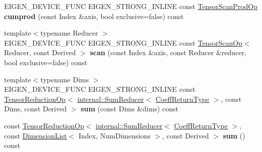 \begin{DoxyCompactItemize}
\item 
\mbox{\label{class_eigen_1_1_tensor_base_3_01_derived_00_01_read_only_accessors_01_4_a227cd4afde67685454a50c6e28f677cd}} 
E\+I\+G\+E\+N\+\_\+\+D\+E\+V\+I\+C\+E\+\_\+\+F\+U\+NC E\+I\+G\+E\+N\+\_\+\+S\+T\+R\+O\+N\+G\+\_\+\+I\+N\+L\+I\+NE const \hyperlink{class_eigen_1_1_tensor_scan_op}{Tensor\+Scan\+Prod\+Op} {\bfseries cumprod} (const Index \&axis, bool exclusive=false) const
\item 
\mbox{\label{class_eigen_1_1_tensor_base_3_01_derived_00_01_read_only_accessors_01_4_a3af1a2adba4d4ba90fe40fe0c1733de0}} 
{\footnotesize template$<$typename Reducer $>$ }\\E\+I\+G\+E\+N\+\_\+\+D\+E\+V\+I\+C\+E\+\_\+\+F\+U\+NC E\+I\+G\+E\+N\+\_\+\+S\+T\+R\+O\+N\+G\+\_\+\+I\+N\+L\+I\+NE const \hyperlink{class_eigen_1_1_tensor_scan_op}{Tensor\+Scan\+Op}$<$ Reducer, const Derived $>$ {\bfseries scan} (const Index \&axis, const Reducer \&reducer, bool exclusive=false) const
\item 
\mbox{\label{class_eigen_1_1_tensor_base_3_01_derived_00_01_read_only_accessors_01_4_a6cc020ff71f0becc5e66a705730bd5e8}} 
{\footnotesize template$<$typename Dims $>$ }\\E\+I\+G\+E\+N\+\_\+\+D\+E\+V\+I\+C\+E\+\_\+\+F\+U\+NC E\+I\+G\+E\+N\+\_\+\+S\+T\+R\+O\+N\+G\+\_\+\+I\+N\+L\+I\+NE const \hyperlink{class_eigen_1_1_tensor_reduction_op}{Tensor\+Reduction\+Op}$<$ \hyperlink{struct_eigen_1_1internal_1_1_sum_reducer}{internal\+::\+Sum\+Reducer}$<$ \hyperlink{group___sparse_core___module}{Coeff\+Return\+Type} $>$, const Dims, const Derived $>$ {\bfseries sum} (const Dims \&dims) const
\item 
\mbox{\label{class_eigen_1_1_tensor_base_3_01_derived_00_01_read_only_accessors_01_4_a0915bf653d2e955154dc710f88e15bea}} 
const \hyperlink{class_eigen_1_1_tensor_reduction_op}{Tensor\+Reduction\+Op}$<$ \hyperlink{struct_eigen_1_1internal_1_1_sum_reducer}{internal\+::\+Sum\+Reducer}$<$ \hyperlink{group___sparse_core___module}{Coeff\+Return\+Type} $>$, const \hyperlink{struct_eigen_1_1_dimension_list}{Dimension\+List}$<$ Index, Num\+Dimensions $>$, const Derived $>$ {\bfseries sum} () const

\end{DoxyCompactItemize}
